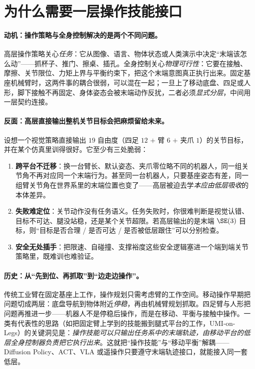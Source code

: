 \section{为什么需要一层操作技能接口}
\label{sec:si-why}

\paragraph{动机：操作策略与全身控制解决的是两个不同问题。}
高层操作策略关心\emph{任务}：它从图像、语言、物体状态或人类演示中决定“末端该怎么动”——抓杯子、推门、擦桌、插孔。全身控制关心\emph{物理可行性}：它要在接触、摩擦、关节限位、力矩上界与平衡约束下，把这个末端意图真正执行出来。固定基座机械臂时，这两件事的耦合很弱，可以混在一起；一旦上了移动底盘、四足或人形，脚下接触不再固定、身体姿态会被末端动作反扰，二者必须\emph{显式分层}，中间用一层契约连接。

\paragraph{反面：高层直接输出整机关节目标会把麻烦留给未来。}
设想一个视觉策略直接输出 $19$ 自由度（四足 $12$ $+$ 臂 $6$ $+$ 夹爪 $1$）的关节目标，并在某个仿真里训得很好。它至少有三处脆弱：
\begin{enumerate}
  \item \textbf{跨平台不迁移}：换一台臂长、默认姿态、夹爪零位略不同的机器人，同一组关节角不再对应同一个末端行为。甚至同一台机器人，只要基座姿态有差，同一组臂关节角在世界系里的末端位置也变了——高层被迫去学\emph{本应由低层吸收}的本体差异。
  \item \textbf{失败难定位}：关节动作没有任务语义。任务失败时，你很难判断是视觉认错、目标不可达、腿没站稳，还是某个关节超限。若高层输出的是末端 $\SE(3)$ 目标，则“目标是否合理 / 是否可达 / 是否被低层跟住”可以分别检查。
  \item \textbf{安全无处插手}：把限速、自碰撞、支撑裕度这些安全逻辑塞进一个端到端关节策略里，既难训也难验证。
\end{enumerate}

\paragraph{历史：从“先到位、再抓取”到“边走边操作”。}
传统工业臂在固定基座上工作，操作规划只需考虑臂的工作空间。移动操作早期把问题切成两层：底盘导航到物体附近\emph{停稳}，再由机械臂规划抓取。四足臂与人形把问题再推进一步——机器人不是停稳后操作，而是在移动、平衡与接触中操作。一类有代表性的思路（如把固定臂上学到的技能搬到腿式平台的工作，UMI-on-Legs\cite{ha2024umi}）的关键洞见是：\emph{操作技能可以只输出任务系中的末端轨迹，由移动平台的低层全身控制器负责把它执行出来}。这就把“操作技能”与“移动平衡”解耦——Diffusion Policy、ACT、VLA 或遥操作只要遵守末端轨迹接口，就能接入同一套低层。

